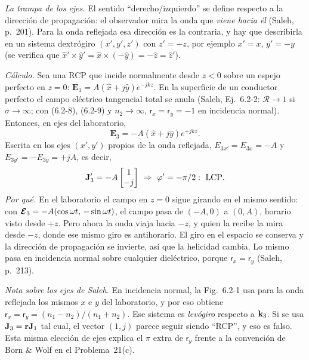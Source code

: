 
\label{sol:20}

 \emph{La trampa de los ejes.} El sentido ``derecho/izquierdo'' se define respecto a la
dirección de propagación: el observador mira la onda que \emph{viene hacia él} (Saleh, p.~201). Para
la onda reflejada esa dirección es la contraria, y hay que describirla en un sistema dextrógiro
$(x',y',z')$ con $z'=-z$, por ejemplo $x'=x$, $y'=-y$ (se verifica que $\hat x'\times\hat y'=\hat x\times(-\hat y)=-\hat z=\hat z'$).

\emph{Cálculo.} Sea una RCP que incide normalmente desde $z<0$ sobre un espejo perfecto en $z=0$:
$\mathbf E_1=A(\hat x+j\hat y)e^{-jkz}$. En la superficie de un conductor perfecto el campo eléctrico tangencial
total se anula (Saleh, Ej.~6.2-2: $\mathcal R\to1$ si $\sigma\to\infty$; con
(6.2-8), (6.2-9) y $n_2\to\infty$, $\mathsf r_x=\mathsf r_y=-1$ en incidencia normal). Entonces, en
ejes del laboratorio,
\[
\mathbf E_3=-A(\hat x+j\hat y)e^{+jkz}.
\]
Escrita en los ejes $(x',y')$ propios de la onda reflejada, $E_{3x'}=E_{3x}=-A$ y
$E_{3y'}=-E_{3y}=+jA$, es decir,
\[
\J_3'=-A\begin{bmatrix}1\\-j\end{bmatrix}\ \Rightarrow\ \varphi'=-\pi/2:\ \text{LCP}.
\]
\emph{Por qué.} En el laboratorio el campo en $z=0$ sigue girando en el mismo sentido: con
$\boldsymbol{\mathcal E}_3=-A(\cos\omega t,\,-\sin\omega t)$, el campo pasa de $(-A,0)$ a $(0,A)$, horario visto desde $+z$.
Pero ahora la onda viaja hacia $-z$, y quien la recibe la mira desde $-z$, donde ese mismo giro es
antihorario. El giro en el espacio se conserva y la dirección de propagación se invierte, así que
la helicidad cambia. Lo mismo pasa en incidencia normal sobre cualquier dieléctrico, porque
$\mathsf r_x=\mathsf r_y$ (Saleh, p.~213).

\emph{Nota sobre los ejes de Saleh.} En incidencia normal, la Fig.~6.2-1 usa para la onda reflejada
los mismos $x$ e $y$ del laboratorio, y por eso obtiene $\mathsf r_x=\mathsf r_y=(n_1-n_2)/(n_1+n_2)$.
Ese sistema es \emph{levógiro} respecto a $\mathbf k_3$. Si se usa $\mathbf J_3=\mathbf r\mathbf J_1$ tal cual, el vector
$(1,j)$ parece seguir siendo ``RCP'', y eso es falso. Esta misma elección de ejes explica el $\pi$ extra
de $\mathsf r_y$ frente a la convención de Born \& Wolf en el Problema~21(c).

